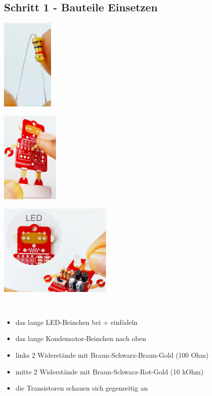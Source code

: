 \documentclass[a4paper]{article}
\begin{document}
\subsection{Schritt 1 - Bauteile Einsetzen}
\begin{minipage}[t]{0.28\textwidth}
  \centering
  \includegraphics[height=4.5cm]{../pictures/Resistor1.jpg}
  \label{img:Resistor1}
  \end{minipage}
\begin{minipage}[t]{0.30\textwidth}
  \centering
  \includegraphics[height=4.5cm]{../pictures/Resistor2.jpg}
  \label{img:Resistor2}
\end{minipage}
\begin{minipage}[t]{0.40\textwidth}
  \centering
  \includegraphics[height=4.5cm]{../pictures/LED1.jpg}
  \label{img:Resistor3}
\end{minipage}
\ \\
\begin{itemize}
\item das lange LED-Beinchen bei + einfädeln
\item das lange Kondensator-Beinchen nach oben
\item links 2 Widerstände mit Braun-Schwarz-Braun-Gold (100 Ohm)
\item mitte 2 Widerstände mit Braun-Schwarz-Rot-Gold (10 kOhm)
\item die Transistoren schauen sich gegenseitig an
\end{itemize}
\end{document}
